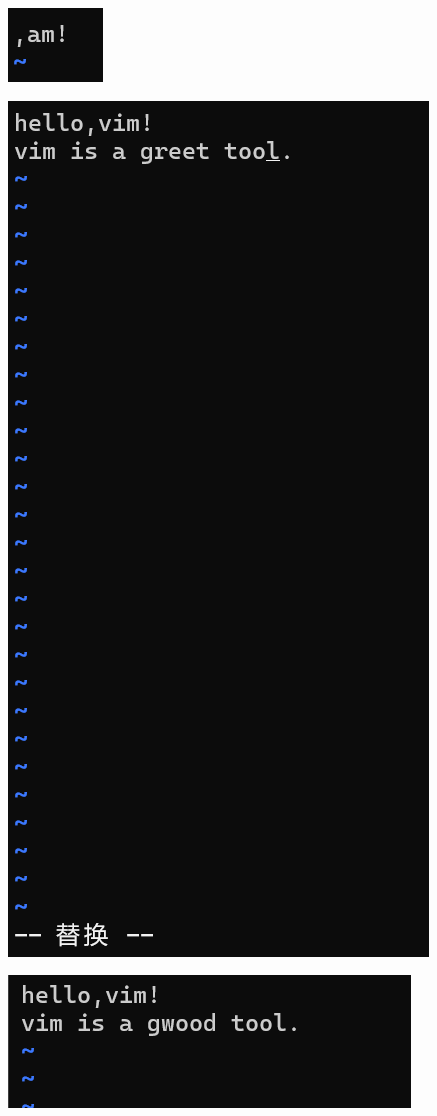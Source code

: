 \documentclass{article}
\begin{document}
\noindent
\begin{minipage}{\linewidth}
 \centering
  \includegraphics[width=0.5\linewidth]{vim7.png}
  \label{fig:example}
\end{minipage}

\noindent
\begin{minipage}{\linewidth}
 \centering
  \includegraphics[width=0.5\linewidth]{vim8.png}
  \label{fig:example}
\end{minipage}

\noindent
\begin{minipage}{\linewidth}
 \centering
  \includegraphics[width=0.5\linewidth]{vim9.png}
  \label{fig:example}
\end{minipage}
\end{document}
